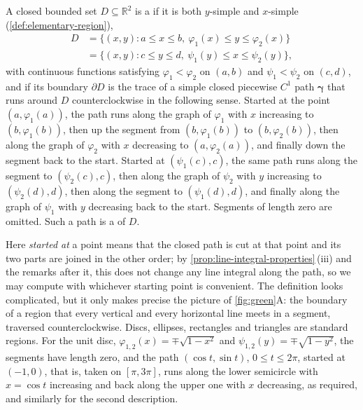 \begin{definition}
\label{def:standard-region}
A closed bounded set $D\subseteq\mathbb R^2$ is a  if it is both $y$-simple and $x$-simple (\cref{def:elementary-region}),
\[
\begin{aligned}
D&=\{(x,y): a\le x\le b,\ \varphi_1(x)\le y\le\varphi_2(x)\}\\
&=\{(x,y): c\le y\le d,\ \psi_1(y)\le x\le\psi_2(y)\},
\end{aligned}
\]
with continuous functions satisfying $\varphi_1<\varphi_2$ on $(a,b)$ and $\psi_1<\psi_2$ on $(c,d)$, and if its boundary $\partial D$ is the trace of a simple closed piecewise $C^1$ path $\boldsymbol\gamma$ that runs around $D$ counterclockwise in the following sense. Started at the point $(a,\varphi_1(a))$, the path runs along the graph of $\varphi_1$ with $x$ increasing to $(b,\varphi_1(b))$, then up the segment from $(b,\varphi_1(b))$ to $(b,\varphi_2(b))$, then along the graph of $\varphi_2$ with $x$ decreasing to $(a,\varphi_2(a))$, and finally down the segment back to the start. Started at $(\psi_1(c),c)$, the same path runs along the segment to $(\psi_2(c),c)$, then along the graph of $\psi_2$ with $y$ increasing to $(\psi_2(d),d)$, then along the segment to $(\psi_1(d),d)$, and finally along the graph of $\psi_1$ with $y$ decreasing back to the start. Segments of length zero are omitted. Such a path is a  of $D$.
\end{definition}

Here \emph{started at} a point means that the closed path is cut at that point and its two parts are joined in the other order; by \cref{prop:line-integral-properties}\,(iii) and the remarks after it, this does not change any line integral along the path, so we may compute with whichever starting point is convenient. The definition looks complicated, but it only makes precise the picture of \cref{fig:green}A: the boundary of a region that every vertical and every horizontal line meets in a segment, traversed counterclockwise. Discs, ellipses, rectangles and triangles are standard regions. For the unit disc, $\varphi_{1,2}(x)=\mp\sqrt{1-x^2}$ and $\psi_{1,2}(y)=\mp\sqrt{1-y^2}$, the segments have length zero, and the path $(\cos t,\sin t)$, $0\le t\le2\pi$, started at $(-1,0)$, that is, taken on $[\pi,3\pi]$, runs along the lower semicircle with $x=\cos t$ increasing and back along the upper one with $x$ decreasing, as required, and similarly for the second description.

